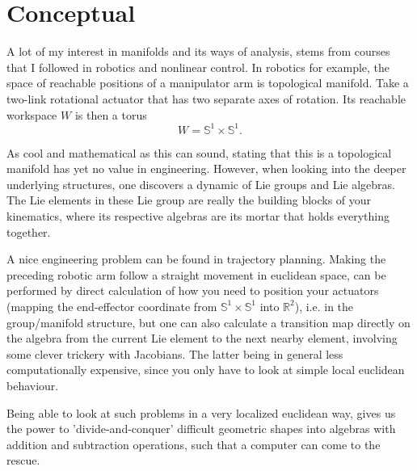 \section{Conceptual}
A lot of my interest in manifolds and its ways of analysis, stems from courses that I followed in robotics and nonlinear control. In robotics for example, the space of reachable positions of a manipulator arm is topological manifold. Take a two-link rotational actuator that has two separate axes of rotation. Its reachable workspace $W$ is then a torus 
\[
W = \mathbb{S}^1 \times  \mathbb{S}^1.
\]

As cool and mathematical as this can sound, stating that this is a topological manifold has yet no value in engineering. However, when looking into the deeper underlying structures, one discovers a dynamic of Lie groups and Lie algebras. The Lie elements in these Lie group are really the building blocks of your kinematics, where its respective algebras are its mortar that holds everything together. 

A nice engineering problem can be found in trajectory planning. Making the preceding robotic arm follow a straight movement in euclidean space, can be performed by direct calculation of how you need to position your actuators (mapping the end-effector coordinate from $ \mathbb{S}^1 \times  \mathbb{S}^1$ into $\mathbb{R}^2$), i.e.  in the group/manifold structure, but one can also calculate a transition map directly on the algebra from the current Lie element to the next nearby element, involving some clever trickery with Jacobians. The latter being in general less computationally expensive, since you only have to look at simple local euclidean behaviour.

Being able to look at such problems in a very localized euclidean way, gives us the power to 'divide-and-conquer' difficult geometric shapes into algebras with addition and subtraction operations, such that a computer can come to the rescue.